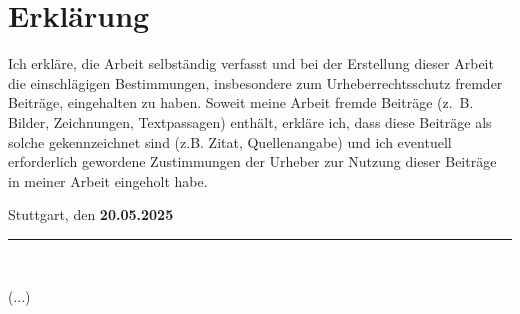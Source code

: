 \chapter*{Erklärung}
Ich erkläre, die Arbeit selbständig verfasst und bei der Erstellung dieser Arbeit die einschlägigen Bestimmungen, insbesondere zum Urheberrechtsschutz fremder Beiträge, eingehalten zu haben. Soweit meine Arbeit fremde Beiträge (z. B. Bilder, Zeichnungen, Textpassagen) enthält, erkläre ich, dass diese Beiträge als solche gekennzeichnet sind (z.B. Zitat, Quellenangabe) und ich eventuell erforderlich gewordene Zustimmungen der Urheber zur Nutzung dieser Beiträge in meiner Arbeit eingeholt habe.

\vspace*{2cm}
\begin{flushleft}
Stuttgart, den \textbf{20.05.2025}
\end{flushleft}
\begin{flushright}
\rule{45mm}{0.4pt}\\
\end{flushright}
\begin{flushright}
(...)
\end{flushright}